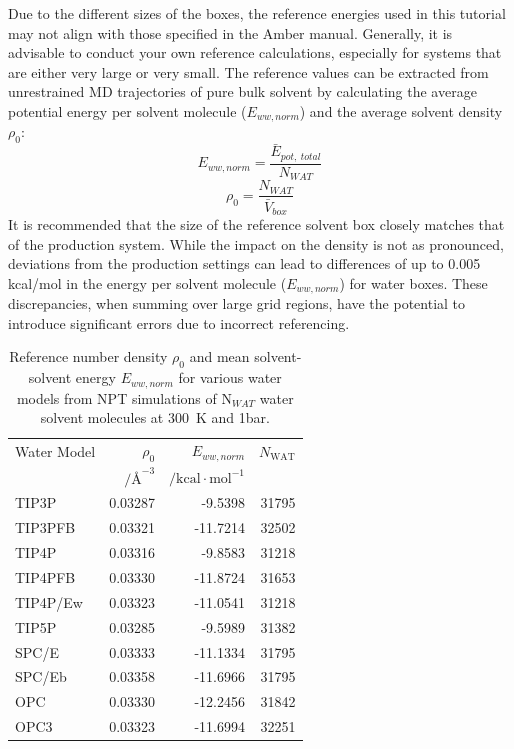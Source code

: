 \documentclass[9pt,tutorial]{livecoms}
\begin{document}
Due to the different sizes of the boxes, the reference energies used in this tutorial may not align with those specified in the Amber manual. 
Generally, it is advisable to conduct your own reference calculations, especially for systems that are either very large or very small. 
The reference values can be extracted from unrestrained MD trajectories of pure bulk solvent by calculating the average potential energy per solvent molecule ($E_{ww, norm}$) and the average solvent density $\rho_0$:
\begin{equation}
	E_{ww, norm} = \frac{\bar{E}_{pot,\ total}}{N_{WAT}}
\end{equation}	
\begin{equation}
	\rho_0 = \frac{N_{WAT}}{\bar{V}_{box}}
\end{equation}
It is recommended that the size of the reference solvent box closely matches that of the production system.
While the impact on the density is not as pronounced, deviations from the production settings can lead to differences of up to 0.005 kcal/mol in the energy per solvent molecule ($E_{ww, norm}$) for water boxes. 
These discrepancies, when summing over large grid regions, have the potential to introduce significant errors due to incorrect referencing.

\begin{table}[h]

	\caption{Reference number density $\rho_0$ and mean solvent-solvent energy $E_{ww, norm}$ for various water models from NPT simulations of N$_{WAT}$ water solvent molecules at \SI{300}{\kelvin} and 1bar.}\label{tab:ref_densities}
	\small
	\begin{tabularx}{\columnwidth}{@{}lrrr@{}}
		\toprule
		Water Model       & $\rho_0$ & $E_{ww, norm}$ & $N_\text{WAT}$ \\
        & $/\text{\AA{}}^{-3}$ & $/\text{kcal}\cdot \text{mol}^{-1}$ & \\
		\midrule
		TIP3P \cite{Jorgensen1983-tip3p}    & 0.03287 & -9.5398   & 31795 \\
		TIP3PFB \cite{Wang2014-tip3p-force-balance}  & 0.03321 & -11.7214  & 32502 \\
		TIP4P \cite{Jorgensen1985-tip4p}    & 0.03316 & -9.8583   & 31218 \\
       TIP4PFB \cite{Wang2014-tip3p-force-balance} & 0.03330 & -11.8724   & 31653 \\
		TIP4P/Ew \cite{Horn2004-tip4pew} & 0.03323 & -11.0541  & 31218 \\
		TIP5P \cite{Mahoney2000-tip5p}    & 0.03285 & -9.5989   & 31382 \\
		SPC/E \cite{Berendsen1987-spce}    & 0.03333 & -11.1334  & 31795 \\
       SPC/Eb \cite{Takemura2012-spceb}   & 0.03358 & -11.6966 & 31795 \\
		OPC \cite{Izadi2014-opc}      & 0.03330 & -12.2456 & 31842 \\
		OPC3 \cite{Izadi2016-opc3}     & 0.03323 & -11.6994 & 32251 \\
		\bottomrule
	\end{tabularx}
\end{table}
\pagebreak %
\end{document}
